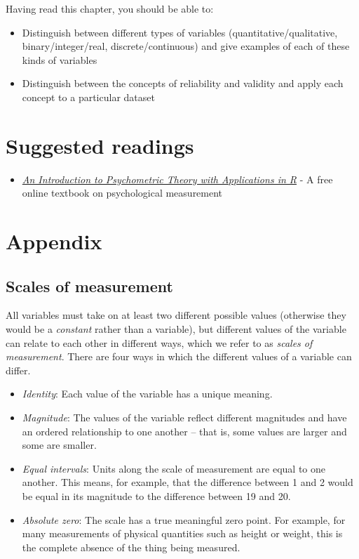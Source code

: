 \documentclass[
  12pt,
]{book}
\providecommand{\tightlist}{%
  \setlength{\itemsep}{0pt}\setlength{\parskip}{0pt}}
\begin{document}
Having read this chapter, you should be able to:

\begin{itemize}
\tightlist
\item
  Distinguish between different types of variables (quantitative/qualitative, binary/integer/real, discrete/continuous) and give examples of each of these kinds of variables
\item
  Distinguish between the concepts of reliability and validity and apply each concept to a particular dataset
\end{itemize}

\hypertarget{suggested-readings-1}{%
\section{Suggested readings}\label{suggested-readings-1}}

\begin{itemize}
\tightlist
\item
  \href{http://www.personality-project.org/r/book/}{\emph{An Introduction to Psychometric Theory with Applications in R}} - A free online textbook on psychological measurement
\end{itemize}

\hypertarget{appendix}{%
\section{Appendix}\label{appendix}}

\hypertarget{scales-of-measurement}{%
\subsection{Scales of measurement}\label{scales-of-measurement}}

All variables must take on at least two different possible values (otherwise they would be a \emph{constant} rather than a variable), but different values of the variable can relate to each other in different ways, which we refer to as \emph{scales of measurement}. There are four ways in which the different values of a variable can differ.

\begin{itemize}
\tightlist
\item
  \emph{Identity}: Each value of the variable has a unique meaning.\\
\item
  \emph{Magnitude}: The values of the variable reflect different magnitudes and have an ordered relationship to one another -- that is, some values are larger and some are smaller.
\item
  \emph{Equal intervals}: Units along the scale of measurement are equal to one another. This means, for example, that the difference between 1 and 2 would be equal in its magnitude to the difference between 19 and 20.
\item
  \emph{Absolute zero}: The scale has a true meaningful zero point. For example, for many measurements of physical quantities such as height or weight, this is the complete absence of the thing being measured.
\end{itemize}
\end{document}
